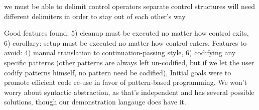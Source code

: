 \documentclass[11pt]{article}
\begin{document}
we must be able to delimit control operators
separate control structures will need different delimiters in order to stay out of each other's way


Good features found:
  5) cleanup must be executed no matter how control exits,
  6) corollary: setup must be executed no matter how control enters,
Features to avoid:
  4) manual translation to continuation-passing style,
  6) codifying any specific patterns (other patterns are always left un-codified, but if we let the user codify patterns himself, no pattern need be codified),
Initial goals were to promote efficient code re-use in favor of pattern-based programming.
We won't worry about syntactic abstraction, as that's independent and has several possible solutions, though our demonstration langauge does have it.




%
%
%
%
%
%
%
\end{document}
